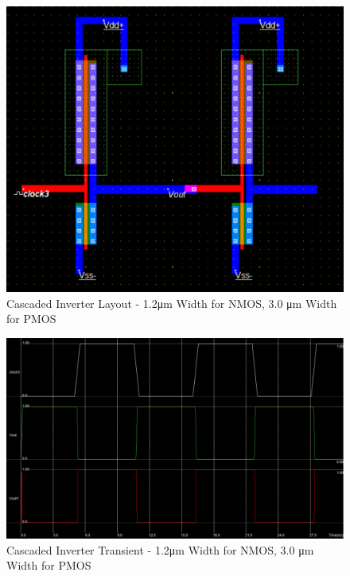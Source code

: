 \begin{figure}[h!]
	\centering
	\includegraphics[scale=0.75]{./images/cascaded_inverter_12nmos_30pmos.PNG}
	\caption{Cascaded Inverter Layout - 1.2\si{\micro\meter} Width for NMOS, 3.0 \si{\micro\meter} Width for PMOS}
	\label{fig:cascaded_inverter_12nmos30pmos}
\end{figure}

\FloatBarrier

\FloatBarrier

\begin{figure}[h!]
	\centering
	\includegraphics[scale=0.50]{./images/cascaded_inverter_transient_12nmos_30pmos.PNG}
	\caption{Cascaded Inverter Transient - 1.2\si{\micro\meter} Width for NMOS, 3.0 \si{\micro\meter} Width for PMOS}
	\label{fig:cascaded_inverter_transient_12nmos30pmos}
\end{figure}

